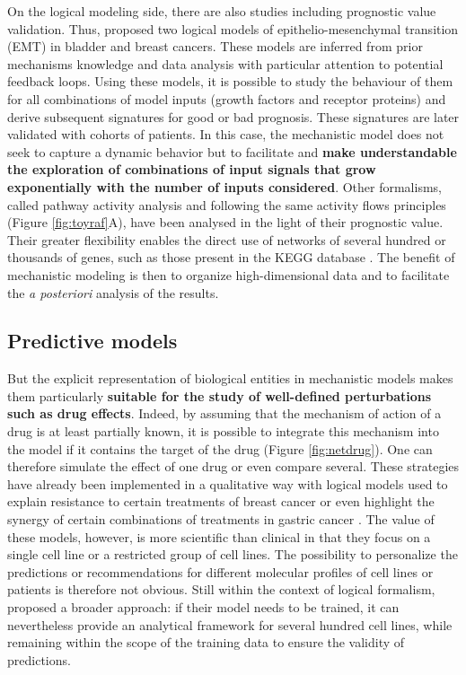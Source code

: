 \documentclass[a4paper,12pt,twoside,onecolumn,openright,final,oldfontcommands]{memoir}
\begin{document}
On the logical modeling side, there are also studies including
prognostic value validation. Thus, \citet{khan2017unraveling} proposed
two logical models of epithelio-mesenchymal transition (EMT) in bladder
and breast cancers. These models are inferred from prior mechanisms
knowledge and data analysis with particular attention to potential
feedback loops. Using these models, it is possible to study the
behaviour of them for all combinations of model inputs (growth factors
and receptor proteins) and derive subsequent signatures for good or bad
prognosis. These signatures are later validated with cohorts of
patients. In this case, the mechanistic model does not seek to capture a
dynamic behavior but to facilitate and \textbf{make understandable the
exploration of combinations of input signals that grow exponentially
with the number of inputs considered}. Other formalisms, called pathway
activity analysis and following the same activity flows principles
(Figure \ref{fig:toyraf}A), have been analysed in the light of their
prognostic value. Their greater flexibility enables the direct use of
networks of several hundred or thousands of genes, such as those present
in the KEGG database \citep{kanehisa2012kegg}. The benefit of
mechanistic modeling is then to organize high-dimensional data and to
facilitate the \emph{a posteriori} analysis of the results.

\subsection{Predictive models}\label{prognostic}

But the explicit representation of biological entities in mechanistic
models makes them particularly \textbf{suitable for the study of
well-defined perturbations such as drug effects}. Indeed, by assuming
that the mechanism of action of a drug is at least partially known, it
is possible to integrate this mechanism into the model if it contains
the target of the drug (Figure \ref{fig:netdrug}). One can therefore
simulate the effect of one drug or even compare several. These
strategies have already been implemented in a qualitative way with
logical models used to explain resistance to certain treatments of
breast cancer \citep{zanudo2017network} or even highlight the synergy of
certain combinations of treatments in gastric cancer
\citep{flobak2015discovery}. The value of these models, however, is more
scientific than clinical in that they focus on a single cell line or a
restricted group of cell lines. The possibility to personalize the
predictions or recommendations for different molecular profiles of cell
lines or patients is therefore not obvious. Still within the context of
logical formalism, \citet{knijnenburg2016logic} proposed a broader
approach: if their model needs to be trained, it can nevertheless
provide an analytical framework for several hundred cell lines, while
remaining within the scope of the training data to ensure the validity
of predictions.
\end{document}
